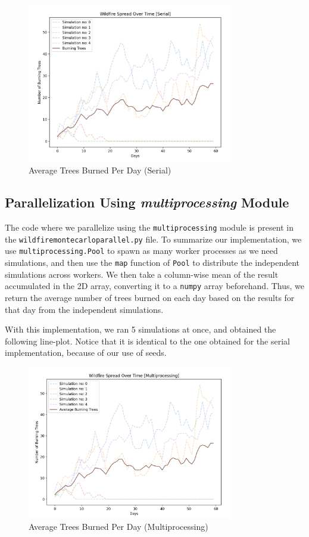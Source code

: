 \documentclass[a4paper,12pt]{article}
\begin{document}
\begin{figure}[H]
  \centering
  \includegraphics[width=0.8\textwidth]{../images/a4_ex1_serial_example.png}
  \caption{Average Trees Burned Per Day (Serial)}
\end{figure}


\subsection{Parallelization Using \textit{multiprocessing} Module}
The code where we parallelize using the \verb|multiprocessing| module is present in the \verb|wildfiremontecarloparallel.py| file. To summarize our implementation, we use \verb|multiprocessing.Pool| to spawn as many worker processes as we need simulations, and then use the \verb|map| function of \verb|Pool| to distribute the independent simulations across workers. We then take a column-wise mean of the result accumulated in the 2D array, converting it to a \verb|numpy| array beforehand. Thus, we return the average number of trees burned on each day based on the results for that day from the independent simulations.

With this implementation, we ran 5 simulations at once, and obtained the following line-plot. Notice that it is identical to the one obtained for the serial implementation, because of our use of seeds.


\begin{figure}[H]
  \centering
  \includegraphics[width=0.8\textwidth]{../images/a4_ex1_multiprocessing_example.png}
  \caption{Average Trees Burned Per Day (Multiprocessing)}
\end{figure}
\end{document}
